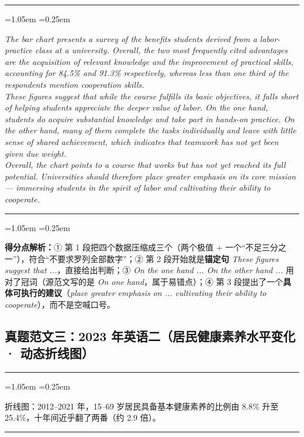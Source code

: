 \documentclass[11pt,a4paper]{ctexart}
\newcommand{\en}[1]{\textit{#1}}
\newenvironment{tpl}[1]{%
  \par\addvspace{7pt}\needspace{4\baselineskip}%
  \noindent{\bfseries\color{accent}#1}\par\nopagebreak
  \vspace{2pt}\noindent\rule{\linewidth}{0.7pt}\par\nopagebreak\vspace{3pt}%
  \begin{list}{}{\leftmargin=1.05em \rightmargin=0.25em \listparindent=0pt
    \itemindent=0pt \topsep=0pt \parsep=2.5pt \itemsep=2.5pt \partopsep=0pt}%
  \item\relax
}{%
  \end{list}\vspace{1pt}\noindent\rule{\linewidth}{0.7pt}\par\addvspace{8pt}%
}
\newenvironment{note}{%
  \par\addvspace{5pt}%
  \begin{list}{}{\leftmargin=1.05em \rightmargin=0.25em \listparindent=0pt
    \itemindent=0pt \topsep=0pt \parsep=2pt \itemsep=2pt \partopsep=0pt}%
  \item\relax\small\color{ink}%
}{%
  \end{list}\addvspace{5pt}%
}
\begin{document}
\begin{tpl}{批注版范文（154 词）}
\en{The bar chart presents a survey of the benefits students derived from a labor-practice class at a university. Overall, the two most frequently cited advantages are the acquisition of relevant knowledge and the improvement of practical skills, accounting for 84.5\% and 91.3\% respectively, whereas less than one third of the respondents mention cooperation skills.}\\[3pt]
\en{These figures suggest that while the course fulfills its basic objectives, it falls short of helping students appreciate the deeper value of labor. On the one hand, students do acquire substantial knowledge and take part in hands-on practice. On the other hand, many of them complete the tasks individually and leave with little sense of shared achievement, which indicates that teamwork has not yet been given due weight.}\\[3pt]
\en{Overall, the chart points to a course that works but has not yet reached its full potential. Universities should therefore place greater emphasis on its core mission --- immersing students in the spirit of labor and cultivating their ability to cooperate.}
\end{tpl}

\begin{note}
\textbf{得分点解析：}① 第 1 段把四个数据压缩成三个（两个极值 + 一个“不足三分之一”），符合“不要求罗列全部数字”；② 第 2 段开始就是\textbf{锚定句} \en{These figures suggest that ...}，直接给出判断；③ \en{On the one hand ... On the other hand ...} 用对了冠词（源范文写的是 \en{On one hand}，属于易错点）；④ 第 3 段提出了一个\textbf{具体可执行的建议}（\en{place greater emphasis on ... cultivating their ability to cooperate}），而不是空喊口号。
\end{note}

\subsection{真题范文三：2023 年英语二（居民健康素养水平变化 · 动态折线图）}

\begin{tpl}{题目要点}
折线图：2012--2021 年，15--69 岁居民具备基本健康素养的比例由 8.8\% 升至 25.4\%，十年间近乎翻了两番（约 2.9 倍）。
\end{tpl}
\end{document}
